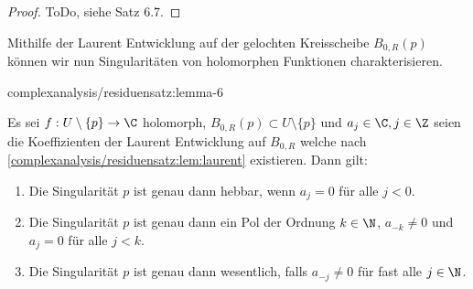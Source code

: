 \documentclass[letterpaper,10pt,german]{jupyterBook}
\begin{document}
\begin{proof}
 ToDo, siehe \cite{Nee17} Satz 6.7.
\end{proof}

\par
Mithilfe der Laurent Entwicklung auf der gelochten Kreisscheibe \(B_{0,R}(p)\) können wir nun Singularitäten von holomorphen Funktionen charakterisieren.
\begin{lemma}{}{complexanalysis/residuensatz:lemma-6}



\par
Es sei \(f:U\setminus\{p\}\to\C\) holomorph, \(B_{0,R}(p)\subset U\setminus\{p\}\) und \(a_j\in\C, j\in\Z\) seien die Koeffizienten der Laurent Entwicklung auf \(B_{0,R}\) welche nach \cref{complexanalysis/residuensatz:lem:laurent} existieren. Dann gilt:
\begin{enumerate}

\item {} 
\par
Die Singularität \(p\) ist genau dann hebbar, wenn \(a_{j}=0\) für alle \(j<0\).

\item {} 
\par
Die Singularität \(p\) ist genau dann ein Pol der Ordnung \(k\in\N\), \(a_{-k}\neq 0\) und \(a_j = 0\) für alle \(j<k\).

\item {} 
\par
Die Singularität \(p\) ist genau dann wesentlich, falls \(a_{-j}\neq 0\) für fast alle \(j\in\N\).

\end{enumerate}
\end{lemma}
\end{document}
